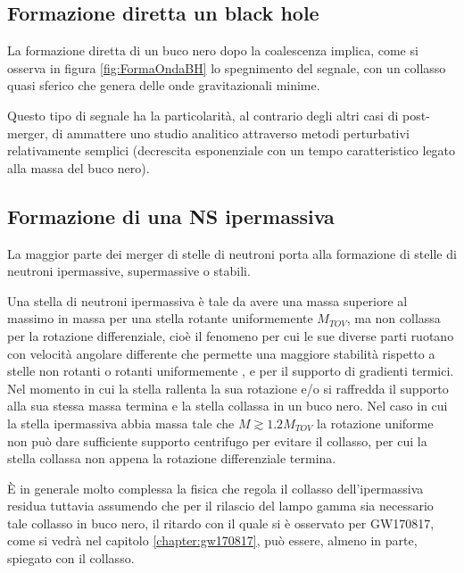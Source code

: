 \subsection{Formazione diretta un black hole}	
\label{subsection:Diretto_Black_hole}

La formazione diretta di un buco nero dopo la coalescenza implica, come si osserva in figura \ref{fig:FormaOndaBH} lo spegnimento del segnale, con un collasso quasi sferico che genera delle onde gravitazionali minime\cite{sarin2020evolution}.

Questo tipo di segnale ha la particolarità, al contrario degli altri casi di post-merger, di ammattere uno studio analitico attraverso metodi perturbativi relativamente semplici (decrescita esponenziale con un tempo caratteristico legato alla massa del buco nero)\cite{maggiore2018gravitational}.

\subsection{Formazione di una NS ipermassiva}
\label{subsection:ipermassiva}	
La maggior parte dei merger di stelle di neutroni porta alla formazione di stelle di neutroni ipermassive, supermassive o stabili. 

Una stella di neutroni ipermassiva è tale da avere una massa superiore al massimo in massa per una stella rotante uniformemente $M_{TOV}$, ma non collassa per la rotazione differenziale, cioè il fenomeno per cui le sue diverse parti ruotano con velocità angolare differente che permette una maggiore stabilità rispetto a stelle non rotanti o rotanti uniformemente \cite{Baumgarte_2000}, e per il supporto di gradienti termici. Nel momento in cui la stella rallenta la sua rotazione e/o si raffredda il supporto alla sua stessa massa termina e la stella collassa in un buco nero. 
Nel caso in cui la stella ipermassiva abbia massa tale che $M \gtrsim 1.2 M_{TOV}$ la rotazione uniforme non può dare sufficiente supporto centrifugo per evitare il collasso, per cui la stella collassa non appena la rotazione differenziale termina.

È in generale molto complessa la fisica che regola il collasso dell'ipermassiva residua tuttavia assumendo che per il rilascio del lampo gamma sia necessario tale collasso in buco nero, il ritardo con il quale si è osservato per GW170817, come si vedrà nel capitolo \ref{chapter:gw170817}, può essere, almeno in parte, spiegato con il collasso.

